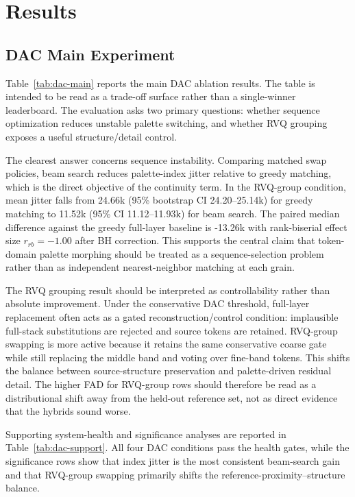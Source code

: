 \documentclass[twoside,a4paper]{article}
\begin{document}
\section{Results}\label{sec:results}

\subsection{DAC Main Experiment}

Table~\ref{tab:dac-main} reports the main DAC ablation results. The table is intended to be read as a trade-off surface rather than a single-winner leaderboard. The evaluation asks two primary questions: whether sequence optimization reduces unstable palette switching, and whether RVQ grouping exposes a useful structure/detail control.

The clearest answer concerns sequence instability. Comparing matched swap policies, beam search reduces palette-index jitter relative to greedy matching, which is the direct objective of the continuity term. In the RVQ-group condition, mean jitter falls from 24.66k (95\% bootstrap CI 24.20--25.14k) for greedy matching to 11.52k (95\% CI 11.12--11.93k) for beam search. The paired median difference against the greedy full-layer baseline is -13.26k with rank-biserial effect size $r_{rb}=-1.00$ after BH correction. This supports the central claim that token-domain palette morphing should be treated as a sequence-selection problem rather than as independent nearest-neighbor matching at each grain.

The RVQ grouping result should be interpreted as controllability rather than absolute improvement. Under the conservative DAC threshold, full-layer replacement often acts as a gated reconstruction/control condition: implausible full-stack substitutions are rejected and source tokens are retained. RVQ-group swapping is more active because it retains the same conservative coarse gate while still replacing the middle band and voting over fine-band tokens. This shifts the balance between source-structure preservation and palette-driven residual detail. The higher FAD for RVQ-group rows should therefore be read as a distributional shift away from the held-out reference set, not as direct evidence that the hybrids sound worse.

Supporting system-health and significance analyses are reported in Table~\ref{tab:dac-support}. All four DAC conditions pass the health gates, while the significance rows show that index jitter is the most consistent beam-search gain and that RVQ-group swapping primarily shifts the reference-proximity--structure balance.
\end{document}
